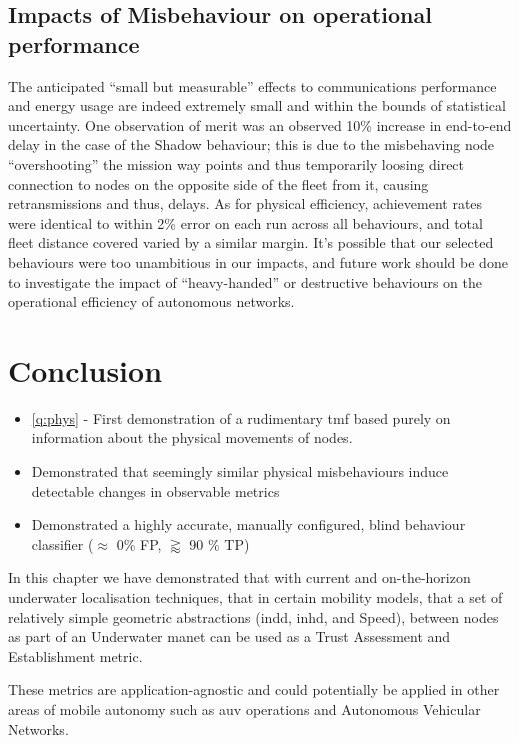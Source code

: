 \subsection{Impacts of Misbehaviour on operational performance}
The anticipated ``small but measurable'' effects to communications performance and energy usage are indeed extremely small and within the bounds of statistical uncertainty.
One observation of merit was an observed 10\% increase in end-to-end delay in the case of the Shadow behaviour; this is due to the misbehaving node ``overshooting'' the mission way points and thus temporarily loosing direct connection to nodes on the opposite side of the fleet from it, causing retransmissions and thus, delays.
As for physical efficiency, achievement rates were identical to within 2\% error on each run across all behaviours, and total fleet distance covered varied by a similar margin.
It's possible that our selected behaviours were too unambitious in our impacts, and future work should be done to investigate the impact of ``heavy-handed'' or destructive behaviours on the operational efficiency of autonomous networks.

\section{Conclusion}
\begin{itemize}
	\item \autoref{q:phys} - First demonstration of a rudimentary \gls{tmf} based purely on information about the physical movements of nodes.
	\item Demonstrated that seemingly similar physical misbehaviours induce detectable changes in observable metrics
	\item Demonstrated a highly accurate, manually configured, blind behaviour classifier ($\approx$ 0\% FP, $\gtrapprox$ 90 \% TP)
\end{itemize}

In this chapter we have demonstrated that with current and on-the-horizon underwater localisation techniques, that in certain mobility models, that a set of relatively simple geometric abstractions (\gls{indd}, \gls{inhd}, and Speed), between nodes as part of an Underwater \gls{manet} can be used as a Trust Assessment and Establishment metric.

These metrics are application-agnostic and could potentially be applied in other areas of mobile autonomy such as \gls{auv} operations and Autonomous Vehicular Networks.

